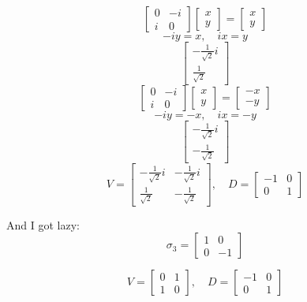\documentclass{article}
\begin{document}
\[ \begin{bmatrix}
    0 & -i \\ 
    i & 0
\end{bmatrix}\begin{bmatrix}
    x \\ y
\end{bmatrix} = \begin{bmatrix}
    x \\ y
\end{bmatrix} \]
\[ -iy = x, \quad ix = y \]
\[ \begin{bmatrix}
    -\frac{1}{\sqrt{2}}i \\
    \frac{1}{\sqrt{2}}
\end{bmatrix} \]
\[ \begin{bmatrix}
    0 & -i \\ 
    i & 0
\end{bmatrix}\begin{bmatrix}
    x \\ y
\end{bmatrix} = \begin{bmatrix}
    -x \\ -y
\end{bmatrix} \]
\[ -iy = -x, \quad ix = -y \]
\[ \begin{bmatrix}
    -\frac{1}{\sqrt{2}}i \\ 
    -\frac{1}{\sqrt{2}}
\end{bmatrix} \]
\[ V = \begin{bmatrix}
    -\frac{1}{\sqrt{2}}i & -\frac{1}{\sqrt{2}}i \\ 
    \frac{1}{\sqrt{2}} & - \frac{1}{\sqrt{2}}
\end{bmatrix} , \quad D = \begin{bmatrix}
    -1 & 0 \\ 0 & 1
\end{bmatrix} \]

And I got lazy:
\[ \sigma_3 = \begin{bmatrix}
    1 & 0 \\ 0 & -1
\end{bmatrix} \]

\[ V = \begin{bmatrix}
    0 & 1 \\ 1 & 0
\end{bmatrix}, 
\quad D = \begin{bmatrix}
    -1 & 0 \\ 0 & 1
\end{bmatrix} \]
\end{document}
